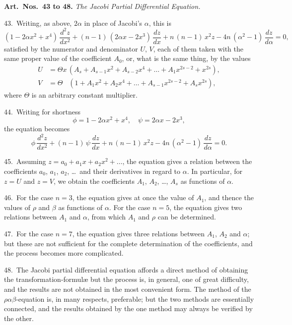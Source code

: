 \documentclass[11pt,a4paper]{book}
\begin{document}
\newpage
\noindent\textbf{Art.\ Nos.\ 43 to 48.} \textit{The Jacobi Partial Differential Equation.}

43.\ Writing, as above, $2\alpha$ in place of Jacobi's $\alpha$, this is
\[
(1 - 2\alpha x^2 + x^4)\, \frac{d^2 z}{dx^2}
+ (n - 1)\, (2\alpha x - 2x^3)\, \frac{dz}{dx}
+ n\, (n - 1)\, x^2 z - 4n\, (\alpha^2 - 1)\, \frac{dz}{d\alpha} = 0,
\]
satisfied by the numerator and denominator $U$, $V$, each of them taken with the
same proper value of the coefficient $A_0$, or, what is the same thing, by the values
\begin{align*}
U &= \Theta x\, (A_s + A_{s-1} x^2 + A_{s-2} x^4 + \ldots + A_1 x^{2s-2} + x^{2s}),\\
V &= \Theta \phantom{x}\; (1 + A_1 x^2 + A_2 x^4 + \ldots + A_{s-1} x^{2s-2} + A_s x^{2s}),
\end{align*}
where $\Theta$ is an arbitrary constant multiplier.

44.\ Writing for shortness
\[
\phi = 1 - 2\alpha x^2 + x^4, \quad \psi = 2\alpha x - 2x^3,
\]
the equation becomes
\[
\phi \, \frac{d^2 z}{dx^2} + (n - 1)\, \psi \, \frac{dz}{dx} + n\, (n - 1)\, x^2 z - 4n\, (\alpha^2 - 1)\, \frac{dz}{d\alpha} = 0.
\]

45.\ Assuming $z = a_0 + a_1 x + a_2 x^2 + \ldots$, the equation gives a relation between the
coefficients $a_0$, $a_1$, $a_2$, \ldots\ and their derivatives in regard to $\alpha$. In particular, for $z = U$
and $z = V$, we obtain the coefficients $A_1$, $A_2$, \ldots, $A_s$ as functions of $\alpha$.

46.\ For the case $n = 3$, the equation gives at once the value of $A_1$, and thence
the values of $\rho$ and $\beta$ as functions of $\alpha$. For the case $n = 5$, the equation gives
two relations between $A_1$ and $\alpha$, from which $A_1$ and $\rho$ can be determined.

47.\ For the case $n = 7$, the equation gives three relations between $A_1$, $A_2$ and $\alpha$;
but these are not sufficient for the complete determination of the coefficients, and the
process becomes more complicated.

48.\ The Jacobi partial differential equation affords a direct method of obtaining the
transformation-formul\ae\; but the process is, in general, one of great difficulty, and the
results are not obtained in the most convenient form. The method of the $\rho\alpha\beta$-equation
is, in many respects, preferable; but the two methods are essentially connected, and
the results obtained by the one method may always be verified by the other.
\end{document}
